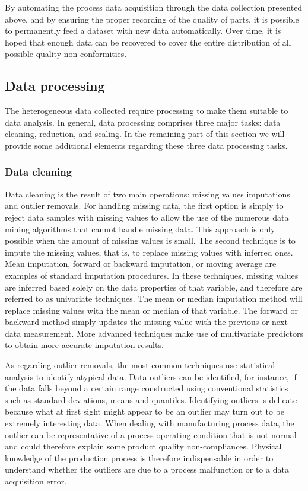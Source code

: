 By automating the process data acquisition through the data collection presented above, and by ensuring the proper recording of the quality of parts, it is possible to permanently feed a dataset with new data automatically. Over time, it is hoped that enough data can be recovered to cover the entire distribution of all possible quality non-conformities. 

\subsection{Data processing} \label{Data Processing}

The heterogeneous data collected require processing to make them suitable to data analysis. In general, data processing comprises three major tasks: data cleaning, reduction, and scaling.
In the remaining part of this section we will provide some additional elements regarding these three data processing tasks. 
  
\subsubsection{Data cleaning}

Data cleaning is the result of two main operations: missing values imputations and outlier removals.
For handling  missing data, the first option is simply to reject data samples with missing values to allow the use of the numerous data mining algorithms that cannot handle missing data. This approach is only possible when the amount of missing values is small. The second technique is to impute the missing values, that is, to replace missing values with inferred ones. Mean imputation, forward or backward imputation, or moving average are examples of standard imputation procedures. In these techniques, missing values are inferred based solely on the data properties of that variable, and therefore are referred to as univariate techniques. The mean or median imputation method will replace missing values with the mean or median of that variable. The forward or backward method simply updates the missing value with the previous or next data measurement. More advanced techniques make use of multivariate predictors to obtain more accurate imputation results. 

As regarding outlier removals, the most common techniques use statistical analysis to identify atypical data. Data outliers can be identified, for instance, if the data falls beyond a certain range constructed using conventional statistics such as standard deviations, means and quantiles. Identifying outliers is delicate because what at first sight might appear to be an outlier may turn out to be extremely interesting data. When dealing with manufacturing process data, the outlier can be representative of a process operating condition that is not normal and could therefore explain some product quality non-compliances. Physical knowledge of the production process is therefore indispensable in order to understand whether the outliers are due to a process malfunction or to a data acquisition error.    


